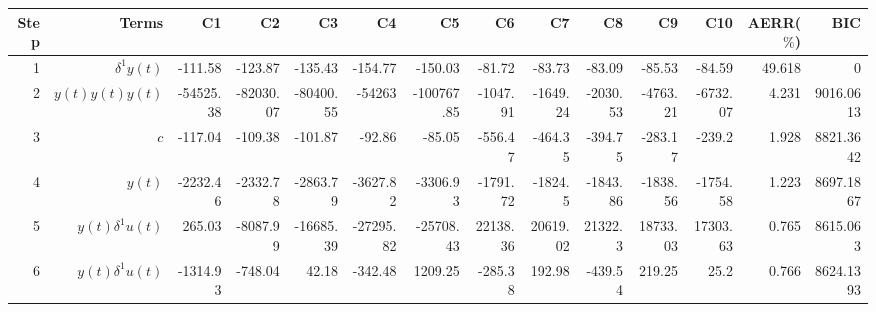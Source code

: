 \begin{tabular}{rrrrrrrrrrrrrr}
Step & Terms & C1 & C2 & C3 & C4 & C5 & C6 & C7 & C8 & C9 & C10 & AERR($\%$) & BIC \\ 
\hline 
1 & $\delta^1 y(t)$ & -111.58 & -123.87 & -135.43 & -154.77 & -150.03 & -81.72 & -83.73 & -83.09 & -85.53 & -84.59 & 49.618 & 0 \\ 
2 & $y(t)y(t)y(t)$ & -54525.38 & -82030.07 & -80400.55 & -54263 & -100767.85 & -1047.91 & -1649.24 & -2030.53 & -4763.21 & -6732.07 & 4.231 & 9016.0613 \\ 
3 & $c$ & -117.04 & -109.38 & -101.87 & -92.86 & -85.05 & -556.47 & -464.35 & -394.75 & -283.17 & -239.2 & 1.928 & 8821.3642 \\ 
4 & $y(t)$ & -2232.46 & -2332.78 & -2863.79 & -3627.82 & -3306.93 & -1791.72 & -1824.5 & -1843.86 & -1838.56 & -1754.58 & 1.223 & 8697.1867 \\ 
5 & $y(t)\delta^1 u(t)$ & 265.03 & -8087.99 & -16685.39 & -27295.82 & -25708.43 & 22138.36 & 20619.02 & 21322.3 & 18733.03 & 17303.63 & 0.765 & 8615.063 \\ 
6 & $y(t)\delta^1 u(t)$ & -1314.93 & -748.04 & 42.18 & -342.48 & 1209.25 & -285.38 & 192.98 & -439.54 & 219.25 & 25.2 & 0.766 & 8624.1393 \\ 
\hline 
\end{tabular}